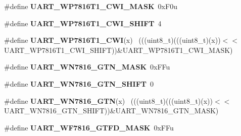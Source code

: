 \begin{DoxyCompactItemize}
\item 
\hypertarget{group___u_a_r_t___register___masks_ga95c5796ae8b5d1bf0db4dcd07801eb16}{}\#define {\bfseries U\+A\+R\+T\+\_\+\+W\+P7816\+T1\+\_\+\+C\+W\+I\+\_\+\+M\+A\+S\+K}~0x\+F0u\label{group___u_a_r_t___register___masks_ga95c5796ae8b5d1bf0db4dcd07801eb16}

\item 
\hypertarget{group___u_a_r_t___register___masks_gaf78c95bd8fe42dfe6caeb8b9c8190e61}{}\#define {\bfseries U\+A\+R\+T\+\_\+\+W\+P7816\+T1\+\_\+\+C\+W\+I\+\_\+\+S\+H\+I\+F\+T}~4\label{group___u_a_r_t___register___masks_gaf78c95bd8fe42dfe6caeb8b9c8190e61}

\item 
\hypertarget{group___u_a_r_t___register___masks_ga9eed9753ad71d926387efd71e3e5f261}{}\#define {\bfseries U\+A\+R\+T\+\_\+\+W\+P7816\+T1\+\_\+\+C\+W\+I}(x)                                      ~(((uint8\+\_\+t)(((uint8\+\_\+t)(x))$<$$<$U\+A\+R\+T\+\_\+\+W\+P7816\+T1\+\_\+\+C\+W\+I\+\_\+\+S\+H\+I\+F\+T))\&U\+A\+R\+T\+\_\+\+W\+P7816\+T1\+\_\+\+C\+W\+I\+\_\+\+M\+A\+S\+K)\label{group___u_a_r_t___register___masks_ga9eed9753ad71d926387efd71e3e5f261}

\item 
\hypertarget{group___u_a_r_t___register___masks_ga2ca85f017d51ef94ac685ce60d365795}{}\#define {\bfseries U\+A\+R\+T\+\_\+\+W\+N7816\+\_\+\+G\+T\+N\+\_\+\+M\+A\+S\+K}~0x\+F\+Fu\label{group___u_a_r_t___register___masks_ga2ca85f017d51ef94ac685ce60d365795}

\item 
\hypertarget{group___u_a_r_t___register___masks_gab7deaf09ea769ec9cb28b66bfc90d141}{}\#define {\bfseries U\+A\+R\+T\+\_\+\+W\+N7816\+\_\+\+G\+T\+N\+\_\+\+S\+H\+I\+F\+T}~0\label{group___u_a_r_t___register___masks_gab7deaf09ea769ec9cb28b66bfc90d141}

\item 
\hypertarget{group___u_a_r_t___register___masks_ga87958ce2f4488cdd8d895aaeda7cf557}{}\#define {\bfseries U\+A\+R\+T\+\_\+\+W\+N7816\+\_\+\+G\+T\+N}(x)                                          ~(((uint8\+\_\+t)(((uint8\+\_\+t)(x))$<$$<$U\+A\+R\+T\+\_\+\+W\+N7816\+\_\+\+G\+T\+N\+\_\+\+S\+H\+I\+F\+T))\&U\+A\+R\+T\+\_\+\+W\+N7816\+\_\+\+G\+T\+N\+\_\+\+M\+A\+S\+K)\label{group___u_a_r_t___register___masks_ga87958ce2f4488cdd8d895aaeda7cf557}

\item 
\hypertarget{group___u_a_r_t___register___masks_gafe82535b1014fd5cc4cfd50169d743ac}{}\#define {\bfseries U\+A\+R\+T\+\_\+\+W\+F7816\+\_\+\+G\+T\+F\+D\+\_\+\+M\+A\+S\+K}~0x\+F\+Fu\label{group___u_a_r_t___register___masks_gafe82535b1014fd5cc4cfd50169d743ac}


\end{DoxyCompactItemize}
